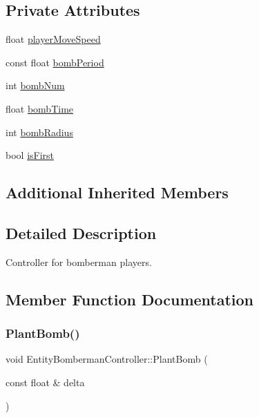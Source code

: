 \subsection*{Private Attributes}
\begin{DoxyCompactItemize}
\item 
float \mbox{\hyperlink{class_entity_bomberman_controller_aa547862699a79584468698a827a58736}{player\+Move\+Speed}}
\item 
const float \mbox{\hyperlink{class_entity_bomberman_controller_a7f480660ac768d9f6d11d7afefb3f656}{bomb\+Period}}
\item 
int \mbox{\hyperlink{class_entity_bomberman_controller_a0f341f1399c40ee9ff9fe829516272b1}{bomb\+Num}}
\item 
float \mbox{\hyperlink{class_entity_bomberman_controller_a31d02fed1826403c9c28182ee3110c55}{bomb\+Time}}
\item 
int \mbox{\hyperlink{class_entity_bomberman_controller_aaad7208276ff0032a123919ff7315057}{bomb\+Radius}}
\item 
bool \mbox{\hyperlink{class_entity_bomberman_controller_a8378c298751c292366950b12574405a5}{is\+First}}
\end{DoxyCompactItemize}
\subsection*{Additional Inherited Members}


\subsection{Detailed Description}
Controller for bomberman players. 

\subsection{Member Function Documentation}
\mbox{\label{class_entity_bomberman_controller_a9298c48059d95138fef3af1426cbf11d}} 
\subsubsection{\texorpdfstring{PlantBomb()}{PlantBomb()}}
{\footnotesize\ttfamily void Entity\+Bomberman\+Controller\+::\+Plant\+Bomb (\begin{DoxyParamCaption}\item[{const float \&}]{delta }\end{DoxyParamCaption})\hspace{0.3cm}{\ttfamily [private]}}

